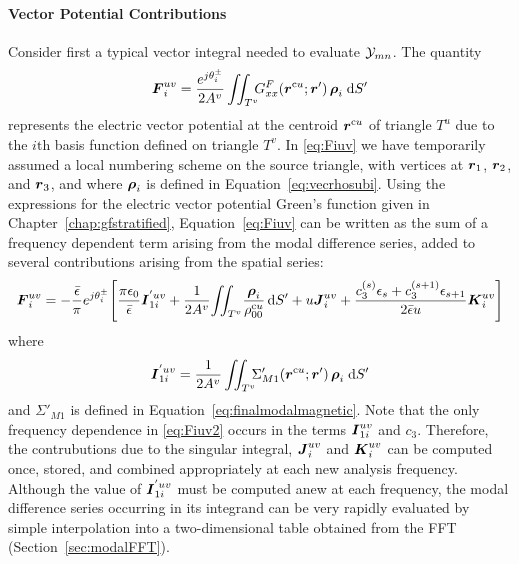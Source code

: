 \paragraph{Vector Potential Contributions}
Consider first a typical vector integral needed
to evaluate $\mathcal{Y}_{mn}$.  
The quantity
\begin{equation}
  \boldsymbol{F}_i^{uv} =   \frac{e^{j\theta_i^\pm}}{2A^v}  \iint_{T^v}  \!\!\!
  G^F_{xx}(\boldsymbol{r}^{\text{c}u};\boldsymbol{r}') \, \boldsymbol{\rho}_i \; \text{d} S' \label{eq:Fiuv}
\end{equation}
represents the electric vector potential at the centroid $\boldsymbol{r}^{\text{c}u}$ of triangle
$T^u$ due to the $i\text{th}$ basis function defined on triangle $T^v$.
In \eqref{eq:Fiuv} we have temporarily assumed a local numbering scheme
on the source triangle, with vertices at $\boldsymbol{r}_1$, $\boldsymbol{r}_2$, and $\boldsymbol{r}_3$,
and where $\boldsymbol{\rho}_i$ is defined in Equation~\eqref{eq:vecrhosubi}.
Using the expressions for the electric vector potential Green's
function given in Chapter~\ref{chap:gfstratified},  Equation~\eqref{eq:Fiuv} can 
be written as 
the sum of a frequency dependent term arising from the modal
difference series, added to several contributions arising from the
spatial series:
\begin{equation}
  \boldsymbol{F}_i^{uv} = -\frac{\bar{\epsilon}}{\pi} e^{j\theta^{\pm}_i}
  \Biggl[
    \frac{\pi\epsilon_0}{\bar{\epsilon}}  \boldsymbol{I}_{1i}^{'uv} + 
    \frac{1}{2A^v} \! \iint_{T^v}  \!
    \frac{\boldsymbol{\rho}_i}{\rho^{\text{c}u}_{00}} \, \text{d} S' +
       u \boldsymbol{J}_i^{uv} +
    \frac{c_3^{(s)} \epsilon_s + c_3^{(s+1)} \epsilon_{s+1}}{2\bar{\epsilon}u}
     \boldsymbol{K}_i^{uv}
  \Biggr] \label{eq:Fiuv2}
\end{equation}
where
\begin{equation}
     \boldsymbol{I}_{1i}^{'uv} =
     \frac{1}{2A^v}  \iint_{T^v}  \!\!\!
     \Sigma'_{M1}(\boldsymbol{r}^{\text{c}u};\boldsymbol{r}')
     \, \boldsymbol{\rho}_i \; \text{d} S' 
\end{equation}
and $\Sigma'_{M1}$ is defined in Equation~\eqref{eq:finalmodalmagnetic}.
Note that the
only frequency dependence in \eqref{eq:Fiuv2} occurs in the terms
$\boldsymbol{I}_{1i}^{uv}$ and $c_3$.  Therefore, the contrubutions due to the
singular integral, $\boldsymbol{J}_i^{uv}$ and $\boldsymbol{K}_i^{uv}$ can be computed once,
stored, and combined appropriately at each new analysis frequency.
Although the value of $\boldsymbol{I}_{1i}^{'uv}$ must be computed anew 
at each frequency, the modal
difference series occurring in its integrand can be very rapidly evaluated by
simple interpolation into a two-dimensional table obtained from the
FFT (Section~\ref{sec:modalFFT}).


